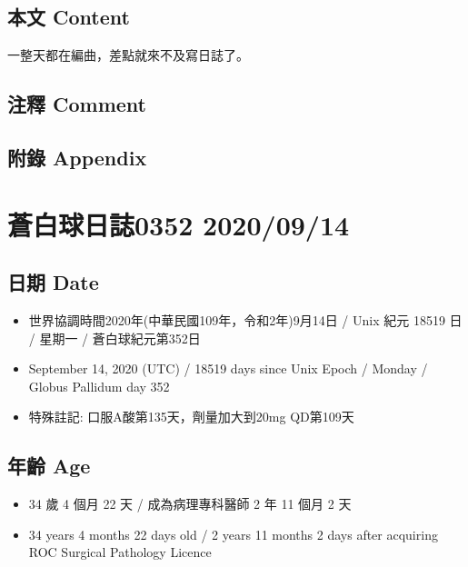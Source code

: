 \documentclass[a5paper, 11pt
]{book}
\providecommand{\tightlist}{%
  \setlength{\itemsep}{0pt}\setlength{\parskip}{0pt}}
\begin{document}
\hypertarget{ux672cux6587-content-12}{%
\subsection{本文 Content}\label{ux672cux6587-content-12}}

一整天都在編曲，差點就來不及寫日誌了。

\hypertarget{ux6ce8ux91cb-comment-12}{%
\subsection{注釋 Comment}\label{ux6ce8ux91cb-comment-12}}

\hypertarget{ux9644ux9304-appendix-12}{%
\subsection{附錄 Appendix}\label{ux9644ux9304-appendix-12}}

\hypertarget{ux84bcux767dux7403ux65e5ux8a8c0352-20200914}{%
\section{蒼白球日誌0352
2020/09/14}\label{ux84bcux767dux7403ux65e5ux8a8c0352-20200914}}

\hypertarget{ux65e5ux671f-date-13}{%
\subsection{日期 Date}\label{ux65e5ux671f-date-13}}

\begin{itemize}
\tightlist
\item
  世界協調時間2020年(中華民國109年，令和2年)9月14日 / Unix 紀元 18519 日
  / 星期一 / 蒼白球紀元第352日
\item
  September 14, 2020 (UTC) / 18519 days since Unix Epoch / Monday /
  Globus Pallidum day 352
\item
  特殊註記: 口服A酸第135天，劑量加大到20mg QD第109天
\end{itemize}

\hypertarget{ux5e74ux9f61-age-13}{%
\subsection{年齡 Age}\label{ux5e74ux9f61-age-13}}

\begin{itemize}
\tightlist
\item
  34 歲 4 個月 22 天 / 成為病理專科醫師 2 年 11 個月 2 天
\item
  34 years 4 months 22 days old / 2 years 11 months 2 days after
  acquiring ROC Surgical Pathology Licence
\end{itemize}
\end{document}
